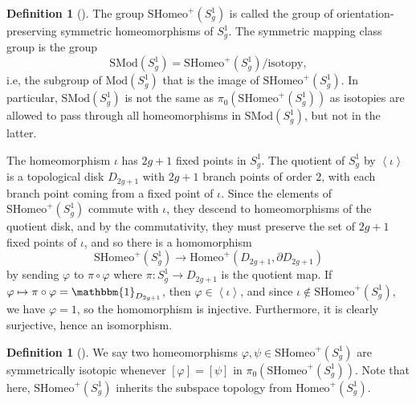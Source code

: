 \documentclass[reqno]{amsart}
\theoremstyle{definition}
\newtheorem{definition}[theorem]{Definition}
\theoremstyle{remark}
\newcommand{\Mod}{{\mathrm{Mod}}}
\newcommand{\SMod}{{\mathrm{SMod}}}
\newcommand{\Homeo}{{\mathrm{Homeo}}}
\newcommand{\SHomeo}{{\mathrm{SHomeo}}}
\begin{document}
 \begin{definition}[]
 The group $\SHomeo^{+} \left( S_g^{1} \right) $ is
 called the group of orientation-preserving
 symmetric homeomorphisms of $S_g^{1}$. 
 The symmetric mapping class group is the group
 \[
 \SMod (S_g^{1}) = 
 \SHomeo^{+} \left( S_g^{1} \right) / \text{isotopy},
 \] 
 i.e, the subgroup of $\Mod \left( S_g^{1} \right) $ that
 is the image of $\SHomeo^{+} \left( S_g^{1} \right) $.
 In particular,
 $\SMod \left( S_g^{1} \right) $ is not the same
 as
 $\pi_0 \left( \SHomeo^{+} 
 \left( S_g^{1} \right) \right) $ as isotopies are
 allowed to pass through all homeomorphisms 
 in $\SMod \left( S_g^{1} \right) $, but not
 in the latter.
 \end{definition}

 The homeomorphism $\iota$ has
  $2g+1$ fixed points in
   $S_g^{1}$. The quotient of
   $S_g^{1}$ by $\left<\iota \right>$ is
   a topological disk
   $D_{2g+1}$ with $2g+1$ branch points of order
   $2$, with each branch point coming from a fixed point of $\iota$.
   Since the elements of  $\SHomeo^{+} \left( S_g^{1} \right) $ 
   commute with $\iota$, they descend to homeomorphisms
   of the quotient disk, and by the commutativity, they
   must preserve the set of  $2g+1$ fixed points of $\iota$,
   and so there is a homomorphism
    \[
   \SHomeo^{+} \left( S_g^{1} \right) 
   \to \Homeo^{+} \left( D_{2g+1}, \partial D_{2g+1} \right) 
   \label{Omega} \tag{$\Omega$}
   \] 
   by sending
   $\varphi $ to
   $\pi \circ \varphi $ where
   $\pi \colon S_g^{1} \to 
   D_{2g+1}$ is the quotient map. If
   $\varphi  \mapsto \pi \circ \varphi  = \mathbbm{1}_{
   D_{2g+1}}$, then $\varphi  
   \in \left<\iota \right>$, and since $\iota 
   \not\in \SHomeo^{+} \left( S_g^{1} \right) $, we have
   $\varphi  = 1$, so
   the homomorphism is injective. Furthermore, it
   is clearly surjective, hence an isomorphism.
   



   \begin{definition}[]
       We say two homeomorphisms
       $\varphi , \psi \in \SHomeo^{+}\left( S_g^{1} \right) $ 
       are symmetrically isotopic whenever
       $\left[ \varphi  \right] =
       \left[ \psi \right] $ in
       $\pi_0 \left( \SHomeo^{+}\left( S_g^{1} \right)  \right) $.
       Note that here,
       $\SHomeo^{+} \left( S_g^{1} \right) $ inherits
       the subspace topology from
       $\Homeo^{+} \left( S_{g}^{1} \right) $.
   \end{definition}
\end{document}
